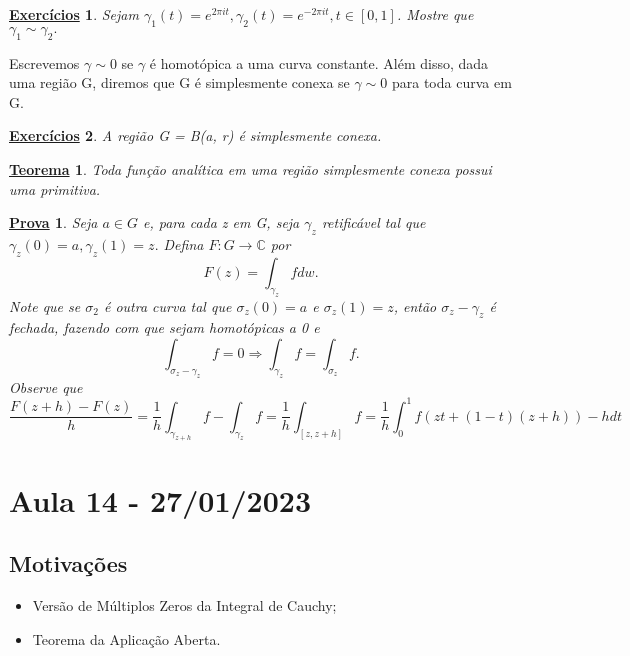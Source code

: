 \documentclass{article}
\newtheorem*{theorem*}{\underline{Teorema}}
\newtheorem*{proof*}{\underline{Prova}}
\newtheorem*{exer*}{\underline{Exerc\'icios}}
\begin{document}
  \begin{exer*}
    Sejam $\gamma_{1}(t) = e^{2\pi it}, \gamma_{2}(t) = e^{-2\pi it}, t\in[0, 1]$. Mostre que $\gamma_{1}\sim \gamma_{2}.$
  \end{exer*}
  Escrevemos $\gamma\sim0$ se $\gamma$ \'e homot\'opica a uma curva constante. Al\'em disso, dada uma regi\~ao G, diremos que
  G \'e simplesmente conexa se $\gamma\sim0$ para toda curva em G.
  \begin{exer*}
    A regi\~ao G = B(a, r) \'e simplesmente conexa.
  \end{exer*}
  \begin{theorem*}
    Toda fun\c c\~ao anal\'itica em uma regi\~ao simplesmente conexa possui uma primitiva.
  \end{theorem*}
  \begin{proof*}
    Seja $a\in{G}$ e, para cada z em G, seja $\gamma_{z}$ retific\'avel tal que $\gamma_{z}(0) = a, \gamma_{z}(1) = z.$ Defina 
    $F:G\rightarrow \mathbb{C}$ por 
    $$
    F(z) = \int_{\gamma_{z}}^{}fdw.
    $$
    Note que se $\sigma_{2}$ \'e outra curva tal que $\sigma_{z}(0) = a$ e $\sigma_{z}(1) = z$, ent\~ao $\sigma_{z} - \gamma_{z}$
    \'e fechada, fazendo com que sejam homot\'opicas a 0 e 
    $$
    \int_{\sigma_{z}-\gamma_{z}}^{}f = 0\Rightarrow \int_{\gamma_{z}}^{}f = \int_{\sigma_{z}}^{}f.
    $$
    Observe que 
    $$
    \frac{F(z+h) - F(z)}{h} = \frac{1}{h}\int_{\gamma_{z+h}}^{}f - \int_{\gamma_{z}}^{}f = \frac{1}{h}\int_{[z, z+h]}^{}f = \frac{1}{h}\int_{0}^{1}f(zt + (1-t)(z+h))-hdt
    $$
  \end{proof*}
  \newpage

  \section{Aula 14 - 27/01/2023}
  \subsection{Motiva\c c\~oes}
  \begin{itemize}
    \item Vers\~ao de M\'ultiplos Zeros da Integral de Cauchy;
    \item Teorema da Aplica\c c\~ao Aberta.
  \end{itemize}
\end{document}
